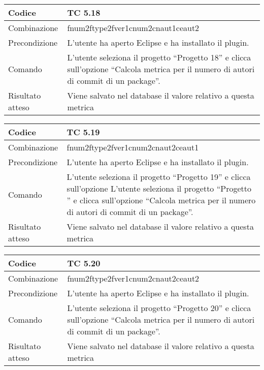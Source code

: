 \begin{table}[ht]
\begin{tabular}{|p{3cm}|p{9cm}|}
\hline
\cellcolor{lightgray}Codice				& TC 5.18								\\
\hline
\cellcolor{lightgray}Combinazione		& fnum2ftype2fver1cnum2cnaut1ceaut2 									\\
\hline
\cellcolor{lightgray}Precondizione		& L'utente ha aperto Eclipse e ha installato il plugin.				\\
\hline
\cellcolor{lightgray}Comando			& L'utente seleziona il progetto ``Progetto 18''  e clicca sull'opzione ``Calcola metrica per il numero di autori di commit di un package''.	\\
\hline
\cellcolor{lightgray}Risultato atteso	& Viene salvato nel database il valore relativo a questa metrica	\\
\hline
\end{tabular}
\end{table}

\begin{table}[ht]
\begin{tabular}{|p{3cm}|p{9cm}|}
\hline
\cellcolor{lightgray}Codice				& TC 5.19								\\
\hline
\cellcolor{lightgray}Combinazione		& fnum2ftype2fver1cnum2cnaut2ceaut1 									\\
\hline
\cellcolor{lightgray}Precondizione		& L'utente ha aperto Eclipse e ha installato il plugin.								\\
\hline
\cellcolor{lightgray}Comando			& L'utente seleziona il progetto ``Progetto 19''  e clicca sull'opzione L'utente seleziona il progetto ``Progetto ''  e clicca sull'opzione ``Calcola metrica per il numero di autori di commit di un package''.	\\
\hline
\cellcolor{lightgray}Risultato atteso	& Viene salvato nel database il valore relativo a questa metrica	\\
\hline
\end{tabular}
\end{table}

\begin{table}[ht]
\begin{tabular}{|p{3cm}|p{9cm}|}
\hline
\cellcolor{lightgray}Codice				& TC 5.20								\\
\hline
\cellcolor{lightgray}Combinazione		& fnum2ftype2fver1cnum2cnaut2ceaut2 									\\
\hline
\cellcolor{lightgray}Precondizione		& L'utente ha aperto Eclipse e ha installato il plugin.									\\
\hline
\cellcolor{lightgray}Comando			& L'utente seleziona il progetto ``Progetto 20''  e clicca sull'opzione ``Calcola metrica per il numero di autori di commit di un package''.	\\
\hline
\cellcolor{lightgray}Risultato atteso	& Viene salvato nel database il valore relativo a questa metrica	\\
\hline
\end{tabular}
\end{table}

